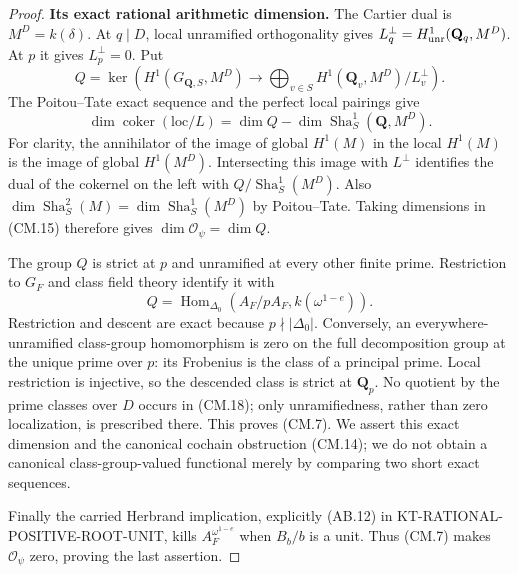 \documentclass[11pt,a4paper]{article}
\theoremstyle{definition}
\renewcommand{\paragraph}[1]{\par\smallskip\noindent\textbf{#1}\quad\ignorespaces}
\newcommand{\Sha}{\operatorname{Sha}}
\begin{document}
\begin{proof}
\paragraph{Its exact rational arithmetic dimension.}
The Cartier dual is $M^D=k(\delta)$.
At $q\mid D$, local unramified orthogonality gives
$L_q^\perp=H^1_{\rm unr}(\mathbf Q_q,M^D)$.
At $p$ it gives $L_p^\perp=0$.
Put
\[
 Q=\ker\!\left(H^1(G_{\mathbf Q,S},M^D)
       \longrightarrow\bigoplus_{v\in S}
                   H^1(\mathbf Q_v,M^D)/L_v^\perp\right).
                                                               \tag{CM.16}
\]
The Poitou--Tate exact sequence and the perfect local
pairings give
\[
 \dim\operatorname{coker}(\mathrm{loc}/L)
       =\dim Q-\dim\Sha^1_S(\mathbf Q,M^D).
                                                               \tag{CM.17}
\]
For clarity, the annihilator of the image of global
$H^1(M)$ in the local $H^1(M)$ is the image of global
$H^1(M^D)$.  Intersecting this image with $L^\perp$
identifies the dual of the cokernel on the left with
$Q/\Sha^1_S(M^D)$.  Also
$\dim\Sha^2_S(M)=\dim\Sha^1_S(M^D)$ by Poitou--Tate.
Taking dimensions in (CM.15) therefore gives
$\dim\mathcal O_\psi=\dim Q$.

The group $Q$ is strict at $p$ and unramified at every
other finite prime.  Restriction to $G_F$ and class field
theory identify it with
\[
              Q=\operatorname{Hom}_{\Delta_0}
                          (A_F/pA_F,k(\omega^{1-e})).           \tag{CM.18}
\]
Restriction and descent are exact because $p\nmid|\Delta_0|$.
Conversely, an everywhere-unramified class-group homomorphism
is zero on the full decomposition group at the unique prime
over $p$: its Frobenius is the class of a principal prime.
Local restriction is injective, so the descended class is
strict at $\mathbf Q_p$.  No quotient by the prime classes
over $D$ occurs in (CM.18); only unramifiedness, rather
than zero localization, is prescribed there.
This proves (CM.7).  We assert this exact dimension and the
canonical cochain obstruction (CM.14); we do not obtain a
canonical class-group-valued functional merely by comparing
two short exact sequences.

Finally the carried Herbrand implication, explicitly (AB.12)
in KT-RATIONAL-POSITIVE-ROOT-UNIT, kills
$A_F^{\omega^{1-e}}$ when $B_b/b$ is a unit.
Thus (CM.7) makes $\mathcal O_\psi$ zero, proving the last
assertion.
\end{proof}
\end{document}

